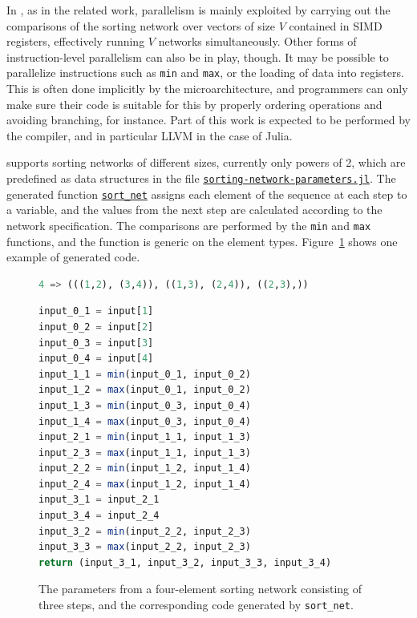 \documentclass{juliacon}
\begin{document}
In \chipsort, as in the related work, parallelism is mainly exploited by carrying out the comparisons of the sorting network over vectors of size $V$ contained in SIMD registers, effectively running $V$ networks simultaneously. Other forms of instruction-level parallelism can also be in play, though. It may be possible to parallelize instructions such as {\tt min} and {\tt max}, or the loading of data into registers. This is often done implicitly by the microarchitecture, and programmers can only make sure their code is suitable for this by properly ordering operations and avoiding branching, for instance. Part of this work is expected to be performed by the compiler, and in particular LLVM in the case of Julia.

\chipsort supports sorting networks of different sizes, currently only powers of 2, which are predefined as data structures in the file \href{https://github.com/nlw0/chipsort.jl/blob/d2d049b7413f0073476021fa62fb748803130768/src/sorting-network-parameters.jl}{\tt sorting-network-parameters.jl}. The generated function \href{https://github.com/nlw0/chipsort.jl/blob/d2d049b7413f0073476021fa62fb748803130768/src/sorting-networks.jl#L13}{\tt sort\_net} assigns each element of the sequence at each step to a variable, and the values from the next step are calculated according to the network specification. The comparisons are performed by the {\tt min} and {\tt max} functions, and the function is generic on the element types. Figure~\ref{fig:sort-net-listing} shows one example of generated code.

\begin{figure}[htb]
\begin{lstlisting}[language = Julia]
4 => (((1,2), (3,4)), ((1,3), (2,4)), ((2,3),))
\end{lstlisting}
\begin{lstlisting}[language = Julia]
input_0_1 = input[1]
input_0_2 = input[2]
input_0_3 = input[3]
input_0_4 = input[4]
input_1_1 = min(input_0_1, input_0_2)
input_1_2 = max(input_0_1, input_0_2)
input_1_3 = min(input_0_3, input_0_4)
input_1_4 = max(input_0_3, input_0_4)
input_2_1 = min(input_1_1, input_1_3)
input_2_3 = max(input_1_1, input_1_3)
input_2_2 = min(input_1_2, input_1_4)
input_2_4 = max(input_1_2, input_1_4)
input_3_1 = input_2_1
input_3_4 = input_2_4
input_3_2 = min(input_2_2, input_2_3)
input_3_3 = max(input_2_2, input_2_3)
return (input_3_1, input_3_2, input_3_3, input_3_4)
\end{lstlisting}
\caption{The parameters from a four-element sorting network consisting of three steps, and the corresponding code generated by {\tt sort\_net}.}
\label{fig:sort-net-listing}
\end{figure}
\end{document}
